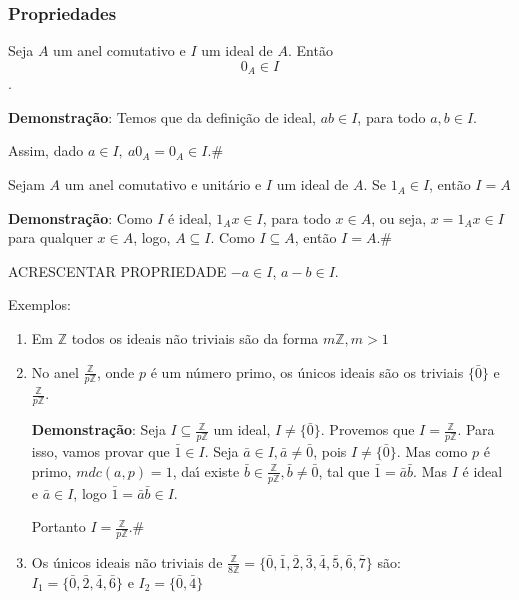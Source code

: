 \subsubsection{Propriedades}
\begin{proposicao} Seja $A$ um anel comutativo e $I$ um ideal de $A$. Ent{\~a}o \[0_{A}\in I\].\end{proposicao}

\textbf{Demonstra{\c c}{\~a}o}: Temos que da defini{\c c}{\~a}o de ideal, $ab\in I$, para todo $a,b\in I$.

Assim, dado $a\in I,\ a0_{A}=0_{A}\in I$.\#

\begin{proposicao} Sejam $A$ um anel comutativo e unit{\'a}rio e $I$ um ideal de $A$. Se $1_{A}\in I$, ent{\~a}o $I=A$\end{proposicao}

\textbf{Demonstra{\c c}{\~a}o}: Como $I$ {\'e} ideal, $1_{A}x\in I$, para todo $x\in A$, ou seja, $x=1_{A}x\in I$ para qualquer $x\in A$, logo, $A\subseteq I$. Como $I\subseteq A$, ent{\~a}o $I=A$.\#

ACRESCENTAR PROPRIEDADE $-a \in I$, $a-b \in I$.

Exemplos:
\begin{enumerate}
\item Em $\mathbb{Z}$ todos os ideais n{\~a}o triviais s{\~a}o da forma $m\mathbb{Z},m>1$
\item No anel $\displaystyle\frac{\mathbb{Z}}{p\mathbb{Z}}$, onde $p$ {\'e} um n{\'u}mero primo, os {\'u}nicos ideais  s{\~a}o os triviais $\{\bar{0}\}$ e $\displaystyle\frac{\mathbb{Z}}{p\mathbb{Z}}$.

\textbf{Demonstra{\c c}{\~a}o}: Seja $I\subseteq\displaystyle\frac{\mathbb{Z}}{p\mathbb{Z}}$ um ideal, $I\neq\{\bar{0}\}$. Provemos que 
$I=\displaystyle\frac{\mathbb{Z}}{p\mathbb{Z}}$. Para isso, vamos provar que $\bar{1}\in I$. Seja $\bar{a}\in I, \bar{a}\neq \bar{0}$, pois $I\neq\{\bar{0}\}$. Mas como $p$ {\'e} primo, $mdc(a,p)=1$, da{\'\i} existe $\bar{b}\in\displaystyle\frac{\mathbb{Z}}{p\mathbb{Z}},\bar{b}\neq\bar{0}$, tal que $\bar{1}=\bar{a}\bar{b}$. Mas $I$ {\'e} ideal e $\bar{a}\in I$, logo $\bar{1}=\bar{a}\bar{b}\in I$.

Portanto $I=\displaystyle\frac{\mathbb{Z}}{p\mathbb{Z}}$.\#
\item Os {\'u}nicos ideais n{\~a}o triviais de $\displaystyle\frac{\mathbb{Z}}{8\mathbb{Z}}=\{\bar{0},\bar{1},\bar{2},\bar{3},\bar{4},\bar{5},\bar{6},\bar{7}\}$ s{\~a}o:\\
$I_{1}=\{\bar{0},\bar{2},\bar{4},\bar{6}\}$ e $I_{2}=\{\bar{0},\bar{4}\}$ 

\end{enumerate}


